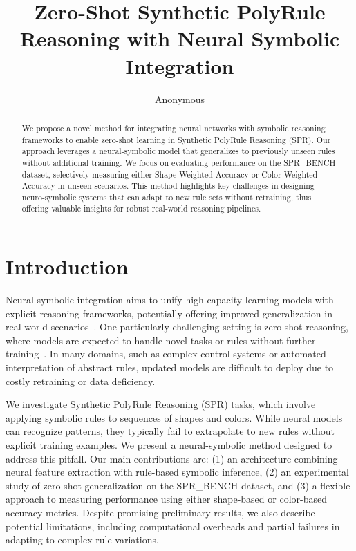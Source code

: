 \documentclass{article} %
\title{Zero-Shot Synthetic PolyRule Reasoning with Neural Symbolic Integration}
\author{Anonymous}
\theoremstyle{plain}
\theoremstyle{definition}
\theoremstyle{remark}
\begin{document}
\maketitle

\begin{abstract}
We propose a novel method for integrating neural networks with symbolic reasoning frameworks to enable zero-shot learning in Synthetic PolyRule Reasoning (SPR). Our approach leverages a neural-symbolic model that generalizes to previously unseen rules without additional training. We focus on evaluating performance on the SPR\_BENCH dataset, selectively measuring either Shape-Weighted Accuracy or Color-Weighted Accuracy in unseen scenarios. This method highlights key challenges in designing neuro-symbolic systems that can adapt to new rule sets without retraining, thus offering valuable insights for robust real-world reasoning pipelines.
\end{abstract}

\section{Introduction}\label{sec:intro}
Neural-symbolic integration aims to unify high-capacity learning models with explicit reasoning frameworks, potentially offering improved generalization in real-world scenarios~\citep{wagner2021neuralsymbolicif,hu2023codepa}. One particularly challenging setting is zero-shot reasoning, where models are expected to handle novel tasks or rules without further training~\citep{kodnongbua2024zeroshotsn}. In many domains, such as complex control systems or automated interpretation of abstract rules, updated models are difficult to deploy due to costly retraining or data deficiency.

We investigate Synthetic PolyRule Reasoning (SPR) tasks, which involve applying symbolic rules to sequences of shapes and colors. While neural models can recognize patterns, they typically fail to extrapolate to new rules without explicit training examples. We present a neural-symbolic method designed to address this pitfall. Our main contributions are: 
(1) an architecture combining neural feature extraction with rule-based symbolic inference, (2) an experimental study of zero-shot generalization on the SPR\_BENCH dataset, and (3) a flexible approach to measuring performance using either shape-based or color-based accuracy metrics. Despite promising preliminary results, we also describe potential limitations, including computational overheads and partial failures in adapting to complex rule variations.
\end{document}
